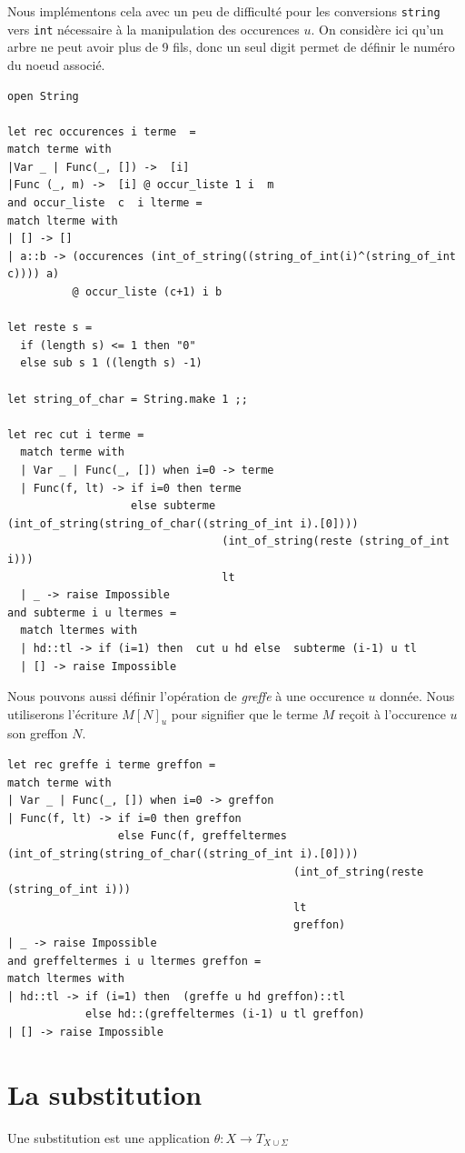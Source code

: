 \documentclass[11pt]{book}
\begin{document}
Nous implémentons cela avec un peu de difficulté pour les conversions 
\verb+string+ vers \verb+int+ nécessaire à la manipulation des occurences $u$. 
On considère ici qu'un arbre ne peut avoir plus de 9 fils, donc un seul digit permet de définir le numéro du noeud associé.
\begin{Verbatim}
open String

let rec occurences i terme  =
match terme with
|Var _ | Func(_, []) ->  [i]
|Func (_, m) ->  [i] @ occur_liste 1 i  m 
and occur_liste  c  i lterme =
match lterme with
| [] -> []
| a::b -> (occurences (int_of_string((string_of_int(i)^(string_of_int c)))) a) 
          @ occur_liste (c+1) i b

let reste s =
  if (length s) <= 1 then "0"
  else sub s 1 ((length s) -1)

let string_of_char = String.make 1 ;;

let rec cut i terme =
  match terme with
  | Var _ | Func(_, []) when i=0 -> terme
  | Func(f, lt) -> if i=0 then terme 
                   else subterme (int_of_string(string_of_char((string_of_int i).[0])))
                                 (int_of_string(reste (string_of_int i)))
                                 lt
  | _ -> raise Impossible
and subterme i u ltermes =
  match ltermes with
  | hd::tl -> if (i=1) then  cut u hd else  subterme (i-1) u tl
  | [] -> raise Impossible

\end{Verbatim}
Nous pouvons aussi définir l'opération de \textit{greffe} à une occurence $u$ donnée. Nous utiliserons
l'écriture $M[N]_u$ pour signifier que le terme $M$ reçoit à l'occurence $u$ son greffon $N$.
\begin{Verbatim}
let rec greffe i terme greffon =
match terme with
| Var _ | Func(_, []) when i=0 -> greffon
| Func(f, lt) -> if i=0 then greffon 
				 else Func(f, greffeltermes (int_of_string(string_of_char((string_of_int i).[0]))) 
				  			                (int_of_string(reste (string_of_int i)))  
								            lt
								            greffon)
| _ -> raise Impossible
and greffeltermes i u ltermes greffon =
match ltermes with
| hd::tl -> if (i=1) then  (greffe u hd greffon)::tl  
            else hd::(greffeltermes (i-1) u tl greffon)
| [] -> raise Impossible
\end{Verbatim}

\section{La substitution}
Une substitution est une application $\theta : X \rightarrow T_{X \cup \Sigma} $
\end{document}
